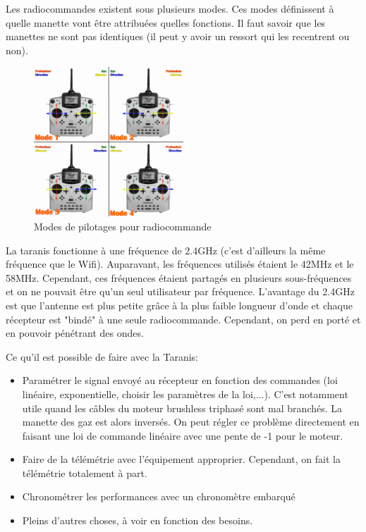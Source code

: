 \documentclass[a4paper, 11pt]{report}
\begin{document}
Les radiocommandes existent sous plusieurs modes. Ces modes définissent à quelle manette vont être attribuées quelles fonctions. Il faut savoir que les manettes ne sont pas identiques (il peut y avoir un ressort qui les recentrent ou non).

\begin{figure}[h]
	\begin{center}
		\includegraphics[width=0.5\textwidth]{images/mode_radiocommande.jpg}
		\caption{Modes de pilotages pour radiocommande}
	\end{center}
\end{figure}

La taranis fonctionne à une fréquence de 2.4GHz (c'est d'ailleurs la même fréquence que le Wifi). Auparavant, les fréquences utilisés étaient le 42MHz et le 58MHz. Cependant, ces fréquences étaient partagés en plusieurs sous-fréquences et on ne pouvait être qu'un seul utilisateur par fréquence. L'avantage du 2.4GHz est que l'antenne est plus petite grâce à la plus faible longueur d'onde et chaque récepteur est "bindé" à une seule radiocommande. Cependant, on perd en porté et en pouvoir pénétrant des ondes.

Ce qu'il est possible de faire avec la Taranis:
\begin{itemize}
\item Paramétrer le signal envoyé au récepteur en fonction des commandes (loi linéaire, exponentielle, choisir les paramètres de la loi,...). C'est notamment utile quand les câbles du moteur brushless triphasé sont mal branchés. La manette des gaz est alors inversés. On peut régler ce problème directement en faisant une loi de commande linéaire avec une pente de -1 pour le moteur.
\item Faire de la télémétrie avec l'équipement approprier. Cependant, on fait la télémétrie totalement à part.
\item Chronométrer les performances avec un chronomètre embarqué
\item Pleins d'autres choses, à voir en fonction des besoins.
\end{itemize}
\end{document}
